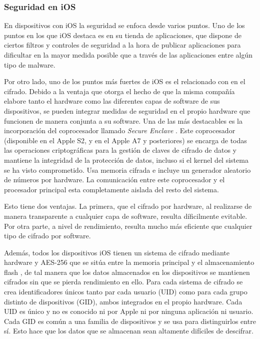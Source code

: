 \subsubsection{Seguridad en iOS}

En dispositivos con iOS la seguridad se enfoca desde varios puntos. Uno de los puntos en los que iOS destaca es en su tienda de aplicaciones, que dispone de ciertos filtros y controles de seguridad a la hora de publicar aplicaciones para dificultar en la mayor medida posible que a través de las aplicaciones entre algún tipo de malware.

Por otro lado, uno de los puntos más fuertes de iOS es el relacionado con en el cifrado. Debido a la ventaja que otorga el hecho de que la misma compañía elabore tanto el hardware como las diferentes capas de software de sus dispositivos, se pueden integrar medidas de seguridad en el propio hardware que funcionen de manera conjunta a su software. Una de las más destacables es la incorporación del coprocesador llamado \emph{Secure Enclave} \cite{ios-sec-guide}. Este coprocesador (disponible en el Apple S2, y en el Apple A7 y posteriores) se encarga de todas las operaciones criptográficas para la gestión de claves de cifrado de datos y mantiene la integridad de la protección de datos, incluso si el kernel del sistema se ha visto comprometido. Usa memoria cifrada e incluye un generador aleatorio de números por hardware. La comunicación entre este coprocesador y el procesador principal esta completamente aislada del resto del sistema.

Esto tiene dos ventajas. La primera, que el cifrado por hardware, al realizarse de manera transparente a cualquier capa de software, resulta díficilmente evitable. Por otra parte, a nivel de rendimiento, resulta mucho más eficiente que cualquier tipo de cifrado por software.

Además, todos los dispositivos iOS tienen un sistema de cifrado mediante hardware y AES-256 que se sitúa entre la memoria principal y el almacenamiento flash \cite{ios-sec-guide}, de tal manera que los datos almacenados en los dispositivos se mantienen cifrados sin que se pierda rendimiento en ello. Para cada sistema de cifrado se crea identificadores únicos tanto par cada usuario (UID) como para cada grupo distinto de dispositivos (GID), ambos integrados en el propio hardware. Cada UID es único y no es conocido ni por Apple ni por ninguna aplicación ni usuario. Cada GID es común a una familia de dispositivos y se usa para distinguirlos entre sí. Esto hace que los datos que se almacenan sean altamente difíciles de descifrar.

